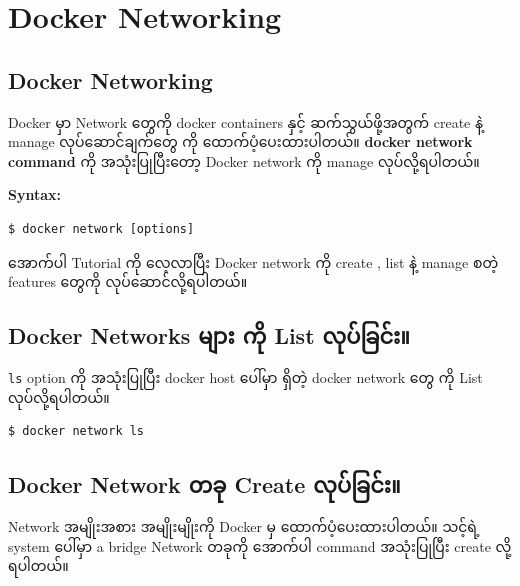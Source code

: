 \hypertarget{docker-networking-2}{%
\section{Docker Networking}\label{docker-networking-2}}

\hypertarget{docker-networking-3}{%
\subsection{Docker Networking}\label{docker-networking-3}}

Docker မှာ Network တွေကို docker containers နှင့် ဆက်သွယ်ဖို့အတွက်
create နဲ့ manage လုပ်ဆောင်ချက်တွေ ကို ထောက်ပံ့ပေးထားပါတယ်။
\textbf{docker network command} ကို အသုံးပြုပြီးတော့ Docker network ကို
manage လုပ်လို့ရပါတယ်။

\textbf{Syntax:}

\begin{verbatim}
$ docker network [options]
\end{verbatim}

အောက်ပါ Tutorial ကို လေ့လာပြီး Docker network ကို create , list နဲ့
manage စတဲ့ features တွေကို လုပ်ဆောင်လို့ရပါတယ်။

\hypertarget{docker-networks-ux1019ux103bux102cux1038-ux1000ux102dux102f-list-ux101cux102fux1015ux103aux1001ux103cux1004ux103aux1038-1}{%
\subsection{Docker Networks များ ကို List
လုပ်ခြင်း။}\label{docker-networks-ux1019ux103bux102cux1038-ux1000ux102dux102f-list-ux101cux102fux1015ux103aux1001ux103cux1004ux103aux1038-1}}

\texttt{ls} option ကို အသုံးပြုပြီး docker host ပေါ်မှာ ရှိတဲ့ docker
network တွေ ကို List လုပ်လို့ရပါတယ်။

\begin{verbatim}
$ docker network ls
\end{verbatim}

\hypertarget{docker-network-ux1010ux1001ux102f-create-ux101cux102fux1015ux103aux1001ux103cux1004ux103aux1038-1}{%
\subsection{Docker Network တခု Create
လုပ်ခြင်း။}\label{docker-network-ux1010ux1001ux102f-create-ux101cux102fux1015ux103aux1001ux103cux1004ux103aux1038-1}}

Network အမျိုးအစား အမျိုးမျိုးကို Docker မှ ထောက်ပံ့ပေးထားပါတယ်။ သင့်ရဲ့
system ပေါ်မှာ a bridge Network တခုကို အောက်ပါ command အသုံးပြုပြီး
create လို့ရပါတယ်။

